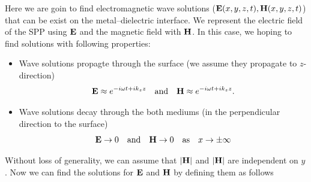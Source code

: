 \documentclass[a4paper]{article}
\numberwithin{equation}{subsection}
\numberwithin{equation}{section}
\begin{document}
Here we are goin to find electromagnetic wave solutions ($\vb{E}(x,y,z,t),\vb{H}(x,y,z,t)$) that can be exist on the metal–dielectric interface. We represent the electric field of the SPP using $\vb{E}$ and the magnetic field with $\vb{H}$. In this case, we hoping to find solutions with following properties:
\begin{itemize}
  \item Wave solutions propagte through the surface (we assume they propagate to $z$-direction) \\
  \begin{equation} \nonumber
    \vb{E} \approx e^{-i\omega t + ik_z z} \quad
    \text{and} \quad
    \vb{H} \approx e^{-i\omega t + ik_z z}.
  \end{equation}
  \item Wave solutions decay through the both mediums (in the perpendicular direction to the surface) \\
  \begin{equation} \nonumber
    \vb{E} \rightarrow 0 \quad
    \text{and} \quad
    \vb{H} \rightarrow 0 \quad
    \text{as} \quad
    x \rightarrow \pm \infty
  \end{equation}
\end{itemize}

Without loss of generality, we can assume that $|\vb{H}|$ and $|\vb{H}|$ are independent on $y$. Now we can find the solutions for $\vb{E}$ and $\vb{H}$ by defining them as follows
\end{document}
